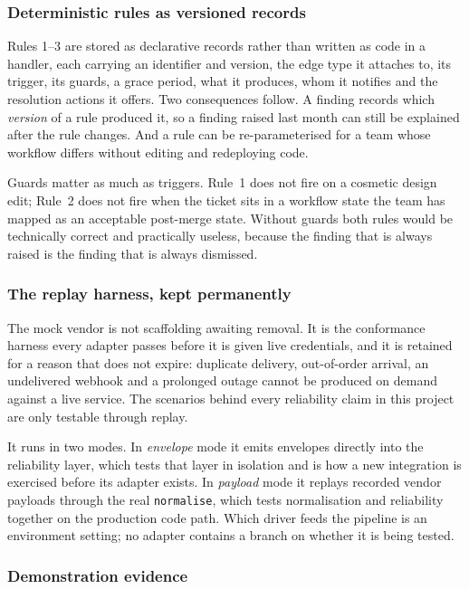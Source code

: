 \subsubsection{Deterministic rules as versioned records}

Rules 1--3 are stored as declarative records rather than written as code in a
handler, each carrying an identifier and version, the edge type it attaches to,
its trigger, its guards, a grace period, what it produces, whom it notifies and
the resolution actions it offers. Two consequences follow. A finding records
which \emph{version} of a rule produced it, so a finding raised last month can
still be explained after the rule changes. And a rule can be re-parameterised
for a team whose workflow differs without editing and redeploying code.

Guards matter as much as triggers. Rule~1 does not fire on a cosmetic design
edit; Rule~2 does not fire when the ticket sits in a workflow state the team
has mapped as an acceptable post-merge state. Without guards both rules would
be technically correct and practically useless, because the finding that is
always raised is the finding that is always dismissed.

\subsubsection{The replay harness, kept permanently}

The mock vendor is not scaffolding awaiting removal. It is the conformance
harness every adapter passes before it is given live credentials, and it is
retained for a reason that does not expire: duplicate delivery, out-of-order
arrival, an undelivered webhook and a prolonged outage cannot be produced on
demand against a live service. The scenarios behind every reliability claim in
this project are only testable through replay.

It runs in two modes. In \emph{envelope} mode it emits envelopes directly into
the reliability layer, which tests that layer in isolation and is how a new
integration is exercised before its adapter exists. In \emph{payload} mode it
replays recorded vendor payloads through the real \texttt{normalise}, which
tests normalisation and reliability together on the production code path. Which
driver feeds the pipeline is an environment setting; no adapter contains a
branch on whether it is being tested.

\subsubsection{Demonstration evidence}

